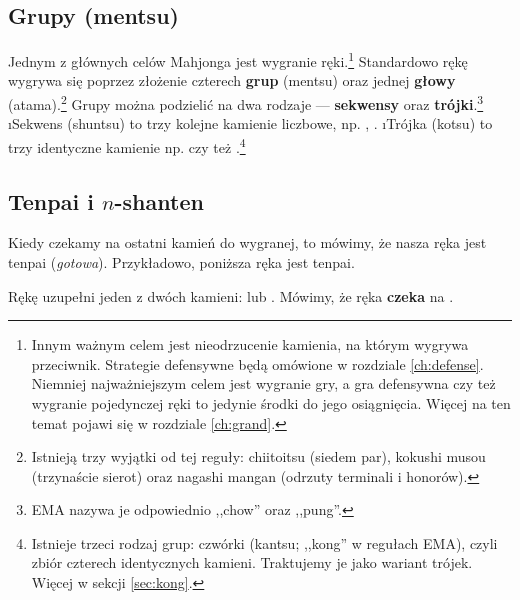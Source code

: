 \vfill
\subsection{Grupy ({\jap mentsu})}
 

Jednym z głównych celów Mahjonga jest wygranie ręki.\footnote{Innym ważnym celem jest nieodrzucenie kamienia, na którym wygrywa przeciwnik. Strategie defensywne będą omówione w rozdziale \ref{ch:defense}. Niemniej najważniejszym celem jest wygranie gry, a gra defensywna czy też wygranie pojedynczej ręki to jedynie środki do jego osiągnięcia. Więcej na ten temat pojawi się w rozdziale \ref{ch:grand}.}
Standardowo rękę wygrywa się poprzez złożenie czterech {\bf grup} ({\jap mentsu}) oraz jednej {\bf głowy} ({\jap atama}).\footnote{Istnieją trzy wyjątki od tej reguły:
{\jap chiitoitsu} (siedem par), {\jap kokushi musou} (trzynaście sierot) oraz {\jap nagashi mangan} (odrzuty terminali i honorów).}
Grupy można podzielić na dwa rodzaje --- {\bf sekwensy} oraz {\bf trójki}.\footnote{EMA nazywa je odpowiednio ,,chow'' oraz ,,pung''.}
\bi
\i Sekwens ({\jap shuntsu}) to trzy kolejne kamienie liczbowe, np. , .
\i Trójka ({\jap kotsu}) to trzy identyczne kamienie np.  czy też .\footnote{Istnieje trzeci rodzaj grup: czwórki ({\jap kantsu}; ,,kong'' w regułach EMA), czyli zbiór czterech identycznych kamieni. Traktujemy je jako wariant trójek. Więcej w sekcji \ref{sec:kong}.}
\ei
 

\subsection{{\jap Tenpai} i {\jap $n$-shanten}}
	 
Kiedy czekamy na ostatni kamień do wygranej, to mówimy, że nasza ręka jest {\jap tenpai} (\emph{gotowa}).
Przykładowo, poniższa ręka jest {\jap tenpai}.
\bigskip
\begin{screen}
\end{screen}
Rękę uzupełni jeden z dwóch kamieni:  lub . Mówimy, że ręka {\bf czeka} na .

